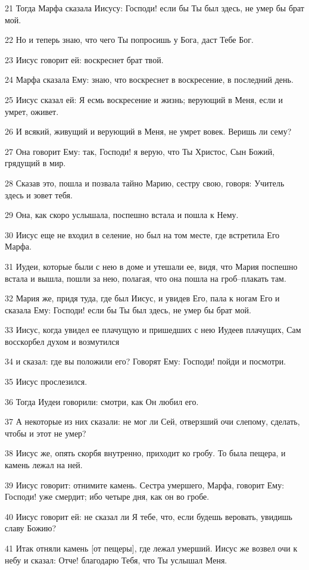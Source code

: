 \par 21 Тогда Марфа сказала Иисусу: Господи! если бы Ты был здесь, не умер бы брат мой.
\par 22 Но и теперь знаю, что чего Ты попросишь у Бога, даст Тебе Бог.
\par 23 Иисус говорит ей: воскреснет брат твой.
\par 24 Марфа сказала Ему: знаю, что воскреснет в воскресение, в последний день.
\par 25 Иисус сказал ей: Я есмь воскресение и жизнь; верующий в Меня, если и умрет, оживет.
\par 26 И всякий, живущий и верующий в Меня, не умрет вовек. Веришь ли сему?
\par 27 Она говорит Ему: так, Господи! я верую, что Ты Христос, Сын Божий, грядущий в мир.
\par 28 Сказав это, пошла и позвала тайно Марию, сестру свою, говоря: Учитель здесь и зовет тебя.
\par 29 Она, как скоро услышала, поспешно встала и пошла к Нему.
\par 30 Иисус еще не входил в селение, но был на том месте, где встретила Его Марфа.
\par 31 Иудеи, которые были с нею в доме и утешали ее, видя, что Мария поспешно встала и вышла, пошли за нею, полагая, что она пошла на гроб--плакать там.
\par 32 Мария же, придя туда, где был Иисус, и увидев Его, пала к ногам Его и сказала Ему: Господи! если бы Ты был здесь, не умер бы брат мой.
\par 33 Иисус, когда увидел ее плачущую и пришедших с нею Иудеев плачущих, Сам восскорбел духом и возмутился
\par 34 и сказал: где вы положили его? Говорят Ему: Господи! пойди и посмотри.
\par 35 Иисус прослезился.
\par 36 Тогда Иудеи говорили: смотри, как Он любил его.
\par 37 А некоторые из них сказали: не мог ли Сей, отверзший очи слепому, сделать, чтобы и этот не умер?
\par 38 Иисус же, опять скорбя внутренно, приходит ко гробу. То была пещера, и камень лежал на ней.
\par 39 Иисус говорит: отнимите камень. Сестра умершего, Марфа, говорит Ему: Господи! уже смердит; ибо четыре дня, как он во гробе.
\par 40 Иисус говорит ей: не сказал ли Я тебе, что, если будешь веровать, увидишь славу Божию?
\par 41 Итак отняли камень [от пещеры], где лежал умерший. Иисус же возвел очи к небу и сказал: Отче! благодарю Тебя, что Ты услышал Меня.
